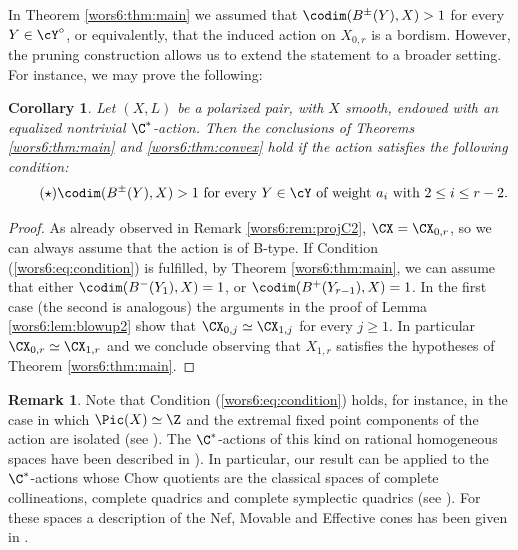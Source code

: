 \documentclass[reqno]{amsproc}
\newtheorem{corollary}[theorem]{Corollary}
\theoremstyle{definition}
\newtheorem{remark}[theorem]{Remark}
\begin{document}
In Theorem \ref{wors6:thm:main} we assumed that  $\codim(B^\pm(Y),X)>1$ for every  $Y\in\cY^\circ$, or equivalently, that the induced action on $X_{0,r}$ is a bordism. However, the pruning construction allows us to extend the statement to a broader setting. For instance, we may prove the following:

\begin{corollary}\label{wors6:cor:main}
Let $(X,L)$ be a polarized pair, with $X$ smooth, endowed with an equalized nontrivial $\C^*$-action. Then the conclusions of Theorems \ref{wors6:thm:main} and \ref{wors6:thm:convex} hold if the action satisfies the following condition:
\begin{equation}\label{wors6:eq:condition}\tag{$\star$} 
\text{$\codim(B^\pm(Y),X)>1$ for every $Y\in \cY$ of weight $a_i$ with $2 \le i \le r-2$.}
\end{equation}
\end{corollary}
\begin{proof}
As already observed in Remark \ref{wors6:rem:projC2}, $\CX =\CX_{0,r}$, so we can always assume that the action is of B-type. 
If Condition (\ref{wors6:eq:condition}) is fulfilled, by Theorem \ref{wors6:thm:main}, we can assume that either $\codim(B^-(Y_1),X)=1$, or $\codim(B^+(Y_{r-1}),X)=1$.
In the first case (the second is analogous) the arguments in the proof of Lemma \ref{wors6:lem:blowup2} show that $\CX_{0,j} \simeq \CX_{1,j}$ for every $j \ge 1$. %
In particular $\CX_{0,r} \simeq \CX_{1,r}$ and we conclude observing that $X_{1,r}$ satisfies the hypotheses of Theorem \ref{wors6:thm:main}. 
\end{proof}

\begin{remark}\label{wors6:rem:isoextreme}
Note that Condition (\ref{wors6:eq:condition}) holds, for instance, in the case in which $\Pic(X) \simeq \Z$ and the extremal fixed point components of the action are isolated (see \cite[Lemma~2.8 (2)]{wors6-WORS1}). The $\C^*$-actions of this kind on rational homogeneous spaces have been described in \cite[Section~3.4]{wors6-WORS5}). In particular, our result can be applied to the $\C^*$-actions whose Chow quotients are the classical spaces of complete collineations, complete quadrics and complete symplectic quadrics (see \cite{wors6-Thaddeus}). For these spaces a description of the Nef, Movable and Effective cones has been given in \cite{wors6-Hue,wors6-Mas1,wors6-Mas3}.\end{remark}
\end{document}
